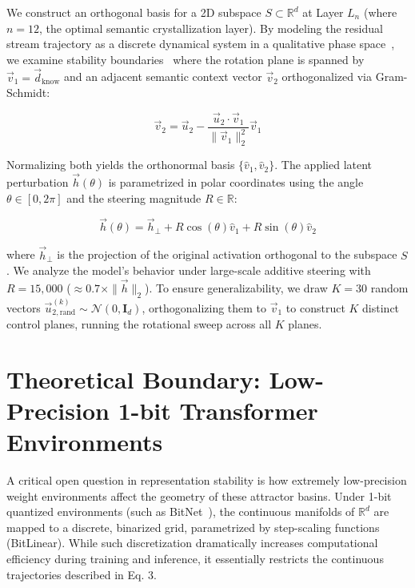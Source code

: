 \documentclass[11pt,a4paper,oneside]{scrbook}
\begin{document}
We construct an orthogonal basis for a 2D subspace $S \subset \mathbb{R}^d$ at Layer $L_n$ (where $n = 12$, the optimal semantic crystallization layer). By modeling the residual stream trajectory as a discrete dynamical system in a qualitative phase space~\cite{poincare1899les}, we examine stability boundaries~\cite{lyapunov1892problem} where the rotation plane is spanned by $\vec{v}_1 = \vec{d}_{\text{know}}$ and an adjacent semantic context vector $\vec{v}_2$ orthogonalized via Gram-Schmidt:

\begin{equation}
\vec{v}_2 = \vec{u}_2 - \frac{\vec{u}_2 \cdot \vec{v}_1}{\|\vec{v}_1\|_2^2}\vec{v}_1
\label{eq:gram_schmidt_2}
\end{equation}

Normalizing both yields the orthonormal basis $\{\hat{v}_1, \hat{v}_2\}$. The applied latent perturbation $\vec{h}(\theta)$ is parametrized in polar coordinates using the angle $\theta \in [0, 2\pi]$ and the steering magnitude $R \in \mathbb{R}$:

\begin{equation}
\vec{h}(\theta) = \vec{h}_{\perp} + R \cos(\theta) \hat{v}_1 + R \sin(\theta) \hat{v}_2
\label{eq:perturbation_2}
\end{equation}

where $\vec{h}_{\perp}$ is the projection of the original activation orthogonal to the subspace $S$. We analyze the model's behavior under large-scale additive steering with $R = 15,000$ ($\approx 0.7 \times \|\vec{h}\|_2$). To ensure generalizability, we draw $K = 30$ random vectors $\vec{u}_{2,\text{rand}}^{(k)} \sim \mathcal{N}(0, \mathbf{I}_d)$, orthogonalizing them to $\vec{v}_1$ to construct $K$ distinct control planes, running the rotational sweep across all $K$ planes.

\chapter{Theoretical Boundary: Low-Precision 1-bit Transformer Environments}
\label{sec:bitnet_limitations}
A critical open question in representation stability is how extremely low-precision weight environments affect the geometry of these attractor basins. Under 1-bit quantized environments (such as BitNet~\cite{wang2023bitnet}), the continuous manifolds of $\mathbb{R}^d$ are mapped to a discrete, binarized grid, parametrized by step-scaling functions (BitLinear). While such discretization dramatically increases computational efficiency during training and inference, it essentially restricts the continuous trajectories described in Eq. 3. 
\end{document}

